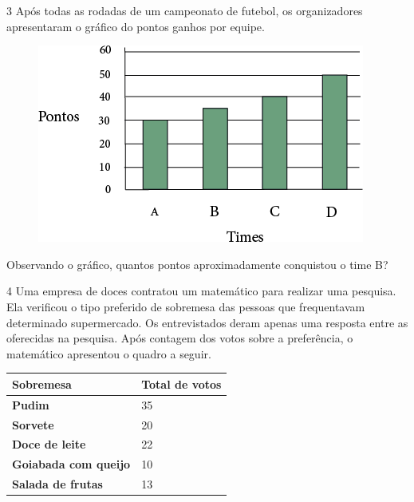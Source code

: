 \num{3} Após todas as rodadas de um campeonato de futebol, os organizadores
apresentaram o gráfico do pontos ganhos por equipe.

\begin{figure}[htpb!]
\centering
\includegraphics[width=\textwidth]{media/image43.png}
\end{figure}

Observando o gráfico, 
quantos pontos aproximadamente conquistou o time B?


\pagebreak

\num{4} Uma empresa de doces contratou um matemático para realizar uma
pesquisa. Ela verificou o tipo preferido de sobremesa das pessoas que
frequentavam determinado supermercado. Os entrevistados deram
apenas uma resposta entre as oferecidas na pesquisa. Após contagem dos
votos sobre a preferência, o matemático apresentou o quadro a seguir.

\begin{longtable}[]{@{}ll@{}}
\toprule
\textbf{Sobremesa} & \textbf{Total de votos}\tabularnewline
\midrule
\endhead
\textbf{Pudim} & 35\tabularnewline
\textbf{Sorvete} & 20\tabularnewline
\textbf{Doce de leite} & 22\tabularnewline
\textbf{Goiabada com queijo} & 10\tabularnewline
\textbf{Salada de frutas} & 13\tabularnewline
\bottomrule
\end{longtable}

